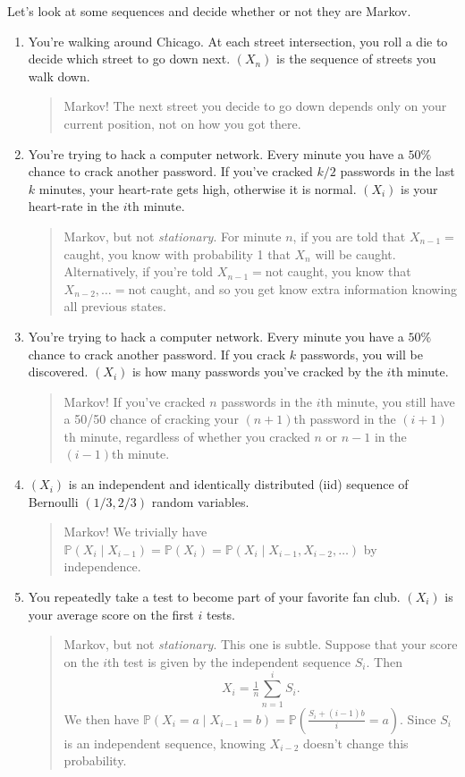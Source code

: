 \documentclass{problemset}
\renewcommand{\P}{\mathbb{P}}
\begin{document}
	Let's look at some sequences and decide whether or not they are Markov.


	\begin{enumerate}
		\item You're walking around Chicago.  At each street intersection, you
			roll a die to decide which street to go down next.
			$(X_n)$ is the sequence of streets you walk down.
			\begin{quote}
				Markov!  The next street you decide to go down depends only
				on your current position, not on how you got there.
			\end{quote}
		\item You're trying to hack a computer network.  Every minute you have a $50\%$ chance
			to crack another password.  If you've cracked $k/2$ passwords in the last $k$ minutes, 
			your heart-rate gets high, otherwise it is normal.  $(X_i)$ is your heart-rate
			in the $i$th minute.
			\begin{quote}
				Markov, but not \emph{stationary}.  For minute $n$, if you are
				told that $X_{n-1}=$caught, you know with probability 1 that $X_n$ will
				be caught.  Alternatively, if you're told $X_{n-1}=$not caught, you know
				that $X_{n-2},\ldots=$not caught, and so you get know extra information
				knowing all previous states.
			\end{quote}
		\item You're trying to hack a computer network.  Every minute you have a $50\%$ chance
			to crack another password.  If you crack $k$ passwords, 
			you will be discovered.  $(X_i)$ is how many passwords you've
			cracked by the $i$th minute.
			\begin{quote}
				Markov! If you've cracked $n$ passwords in the $i$th minute, 
				you still have a 50/50 chance of cracking your $(n+1)$th password in the $(i+1)$th
				minute, regardless of whether you cracked $n$ or $n-1$ in the $(i-1)$th minute.
			\end{quote}
		\item $(X_i)$ is an independent and identically distributed (iid) sequence of Bernoulli
			$(1/3,2/3)$ random variables.
			\begin{quote}
				Markov!  We trivially have $\P(X_i\mid X_{i-1}) = \P(X_i) = \P(X_i\mid X_{i-1}, X_{i-2},\ldots)$ by independence.
			\end{quote}
		\item You repeatedly take a test to become part of your favorite fan club.  $(X_i)$ is your average 
			score on the first $i$ tests.
			\begin{quote}
				Markov, but not \emph{stationary}.  This one is subtle.  Suppose that your
				score on the $i$th test is given by the independent sequence $S_i$.  Then
				\[
					X_i = \tfrac{1}{n}\sum_{n=1}^i S_i.
				\]
				We then have $\P(X_i=a\mid X_{i-1}=b) = \P\left(\frac{S_i+(i-1)b}{i} = a\right)$.  Since $S_i$ 
				is an independent sequence, knowing $X_{i-2}$ doesn't change this probability.
			\end{quote}
	\end{enumerate}
\end{document}
